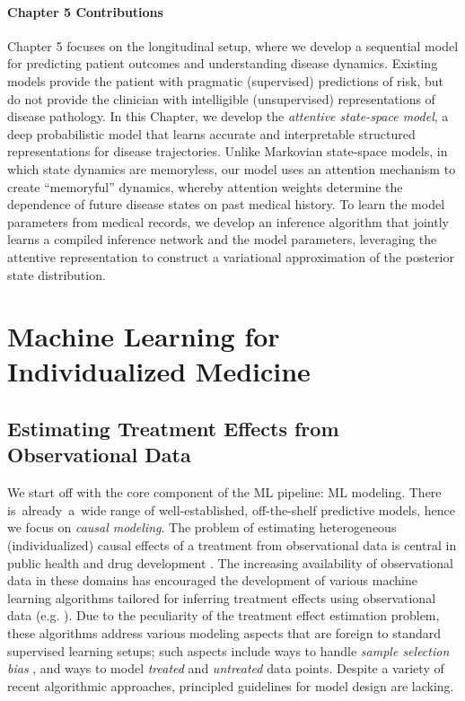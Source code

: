 \documentclass [PhD] {uclathes}
\begin{document}
\subsection*{Chapter 5 Contributions}
Chapter 5 focuses on the longitudinal setup, where we develop a sequential model for predicting patient outcomes and understanding disease dynamics. Existing models provide the patient with pragmatic (supervised) predictions of risk, but do not provide the clinician with intelligible (unsupervised) representations of disease pathology. In this Chapter, we develop the \textit{attentive state-space model}, a deep probabilistic model that learns accurate and interpretable structured representations for disease trajectories. Unlike Markovian state-space models, in which state dynamics are memoryless, our model uses an attention mechanism to create ``memoryful'' dynamics, whereby attention weights determine the dependence of future disease states on past medical history. To learn the model parameters from medical records, we develop an inference algorithm that jointly learns a compiled inference network and the model parameters, leveraging the attentive representation to construct a variational approximation of the posterior state distribution. 

\part{Machine Learning for Individualized Medicine}

\chapter{Estimating Treatment Effects from Observational Data}

We start off with the core component of the ML pipeline: ML modeling. There is~already~a~wide range of well-established, off-the-shelf predictive models, hence we focus on \textit{causal modeling}. The problem of estimating heterogeneous (individualized) causal effects of a treatment from observational data is central in public health and drug development \cite{foster2011subgroup}. The increasing availability of observational data in these domains has encouraged the development of various machine learning algorithms tailored for inferring treatment effects using observational data (e.g. \cite{li2017matching,wager2017estimation,shalit2016estimating,alaa2017bayesian}). Due to the peculiarity of the treatment effect estimation problem, these algorithms address various modeling aspects that are foreign to standard supervised learning setups; such aspects include ways to handle \textit{sample selection bias} \cite{heckman1977sample}, and ways to model \textit{treated} and \textit{untreated} data points. Despite a variety of recent algorithmic approaches, principled guidelines for model design are lacking. 
\end{document}

